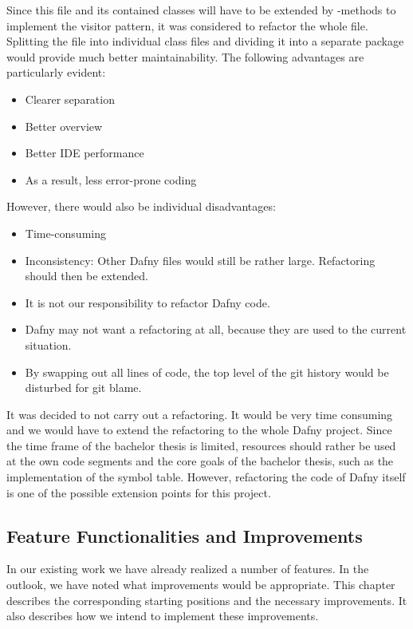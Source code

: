 Since this file and its contained classes will have to be extended by -methods
to implement the visitor pattern, it was considered to refactor the whole file.\\

Splitting the file into individual class files and dividing it into a separate package would provide much better maintainability.
The following advantages are particularly evident:
\begin{itemize}
    \item Clearer separation
    \item Better overview
    \item Better IDE performance
    \item As a result, less error-prone coding
\end{itemize}

However, there would also be individual disadvantages:
\begin{itemize}
    \item Time-consuming
    \item Inconsistency: Other Dafny files would still be rather large. Refactoring should then be extended.
    \item It is not our responsibility to refactor Dafny code.
    \item Dafny may not want a refactoring at all, because they are used to the current situation.
    \item By swapping out all lines of code, the top level of the git history would be disturbed for git blame.
\end{itemize}

It was decided to not carry out a refactoring.
It would be very time consuming and we would have to extend the refactoring to the whole Dafny project.
Since the time frame of the bachelor thesis is limited, resources should rather be used at the own code segments and the core goals of the bachelor thesis, such as the implementation of the symbol table.
However, refactoring the code of Dafny itself is one of the possible extension points for this project.


\subsection{Feature Functionalities and Improvements }
\label{section:analysis:features}

In our existing work we have already realized a number of features.
In the outlook, we have noted what improvements would be appropriate.
This chapter describes the corresponding starting positions and the necessary improvements.
It also describes how we intend to implement these improvements.

